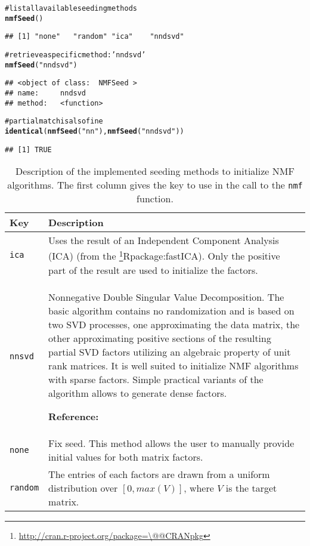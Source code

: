 \documentclass[a4paper]{article}\usepackage{graphicx, color}
\makeatletter
\newcommand{\hlfunctioncall}[1]{\textcolor[rgb]{0.501960784313725,0,0.329411764705882}{\textbf{#1}}}%
\newcommand{\hlstring}[1]{\textcolor[rgb]{0.6,0.6,1}{#1}}%
\newcommand{\hlcomment}[1]{\textcolor[rgb]{0.180392156862745,0.6,0.341176470588235}{#1}}%
\newenvironment{kframe}{%
 \def\at@end@of@kframe{}%
 \ifinner\ifhmode%
  \def\at@end@of@kframe{\end{minipage}}%
  \begin{minipage}{\columnwidth}%
 \fi\fi%
 \def\FrameCommand##1{\hskip\@totalleftmargin \hskip-\fboxsep
 \colorbox{shadecolor}{##1}\hskip-\fboxsep
     \hskip-\linewidth \hskip-\@totalleftmargin \hskip\columnwidth}%
 \MakeFramed {\advance\hsize-\width
   \@totalleftmargin\z@ \linewidth\hsize
   \@setminipage}}%
 {\par\unskip\endMakeFramed%
 \at@end@of@kframe}
\newenvironment{knitrout}{}{} %
\let\code=\texttt
\newcommand{\pkgname}[1]{\textit{#1}\xspace}
\newcommand{\CRANurl}[1]{\url{http://cran.r-project.org/package=#1}}
\def\CRANpkg{\@ifstar\@CRANpkg\@@CRANpkg}
\def\@CRANpkg#1{\href{http://cran.r-project.org/package=#1}{\pkgname{#1}}\footnote{\CRANurl{#1}}}
\def\@@CRANpkg#1{\href{http://cran.r-project.org/package=#1}{\pkgname{#1}} package\footnote{\CRANurl{#1}}}
\def\citeCRANpkg{\@ifstar\@citeCRANpkg\@@citeCRANpkg}
\def\@citeCRANpkg#1{\CRANpkg{#1}\cite*{Rpackage:#1}}
\def\@@citeCRANpkg#1{\CRANpkg{#1}~\cite{Rpackage:#1}}
\renewcommand{\cite}[1]{\parencite{#1}}
\makeatother
\begin{document}
\begin{knitrout}
\color{fgcolor}\begin{kframe}
\begin{alltt}
\hlcomment{# list all available seeding methods}
\hlfunctioncall{nmfSeed}()
\end{alltt}
\begin{verbatim}
## [1] "none"   "random" "ica"    "nndsvd"
\end{verbatim}
\begin{alltt}
\hlcomment{# retrieve a specific method: \hlstring{'nndsvd'}}
\hlfunctioncall{nmfSeed}(\hlstring{"nndsvd"})
\end{alltt}
\begin{verbatim}
## <object of class:  NMFSeed >
## name:	 nndsvd 
## method:	 <function>
\end{verbatim}
\begin{alltt}
\hlcomment{# partial match is also fine}
\hlfunctioncall{identical}(\hlfunctioncall{nmfSeed}(\hlstring{"nn"}), \hlfunctioncall{nmfSeed}(\hlstring{"nndsvd"}))
\end{alltt}
\begin{verbatim}
## [1] TRUE
\end{verbatim}
\end{kframe}
\end{knitrout}


\begin{table}[h!t]
\begin{tabularx}{\textwidth}{lX}
\hline
Key & Description\\
\hline
\code{ica} & Uses the result of an Independent Component Analysis (ICA) (from
the \citeCRANpkg{fastICA}).
Only the positive part of the result are used to initialize the factors.\\
\hline
%
\code{nnsvd} & Nonnegative Double Singular Value Decomposition.
The basic algorithm contains no randomization and is based on two SVD processes, one approximating the data matrix, the other approximating positive sections of the resulting partial SVD factors utilizing an algebraic property of unit rank matrices. 
It is well suited to initialize NMF algorithms with sparse factors. Simple practical variants of the algorithm allows to generate dense factors.

\textbf{Reference:} \cite{Boutsidis2008}\\
\hline
%
\code{none} & Fix seed.
This method allows the user to manually provide initial values for both matrix factors.\\ 
\hline
%
\code{random} & The entries of each factors are drawn from a uniform distribution over $[0, max(V)]$, where $V$ is the target matrix.\\
\hline
\end{tabularx}
\caption{Description of the implemented seeding methods to initialize NMF algorithms.
The first column gives the key to use in the call to the \texttt{nmf} function.\label{tab:seed}}
\end{table}
\end{document}
